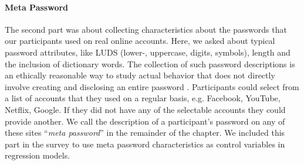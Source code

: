 \paragraph{Meta Password} The second part was about collecting characteristics about the passwords that our participants used on real online accounts. Here, we asked about typical password attributes, like LUDS (lower-, uppercase, digits, symbols), length and the inclusion of dictionary words. The collection of such password descriptions is an ethically reasonable way to study actual behavior that does not directly involve creating and disclosing an entire password \cite{VonZezschwitz2013SurvivalShortest}. Participants could select from a list of accounts that they used on a regular basis, e.g. Facebook, YouTube, Netflix, Google. If they did not have any of the selectable accounts they could provide another. We call the description of a participant's password on any of these sites ``\textit{meta password}'' in the remainder of the chapter. We included this part in the survey to use meta password characteristics as control variables in regression models.




